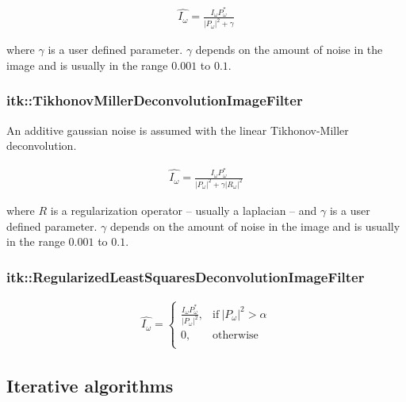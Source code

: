 \documentclass{InsightArticle}
\begin{document}
\begin{eqnarray}
\label{eq:imageFormation}
\hat{I_{\omega}} = \frac{I_{\omega} P_{\omega}^*}{\lvert P_{\omega}\rvert^2 + \gamma}
\end{eqnarray}

where $\gamma$ is a user defined parameter. $\gamma$ depends on the amount of noise in the image and is
usually in the range $0.001$ to $0.1$.

\subsubsection{itk::TikhonovMillerDeconvolutionImageFilter}

An additive gaussian noise is assumed with the linear Tikhonov-Miller deconvolution. 

\begin{eqnarray}
\label{eq:imageFormation}
\hat{I_{\omega}} = \frac{I_{\omega} P_{\omega}^*}{\lvert P_{\omega}\rvert^2 + \gamma\lvert R_{\omega}\rvert^2}
\end{eqnarray}

where $R$ is a regularization operator -- usually a laplacian -- and $\gamma$ is a user defined parameter.
$\gamma$ depends on the amount of noise in the image and is usually in the range $0.001$ to $0.1$.

\subsubsection{itk::RegularizedLeastSquaresDeconvolutionImageFilter}

\begin{eqnarray}
\label{eq:imageFormation}
\hat{I_{\omega}} =
\begin{cases} 
  \frac{I_{\omega} P_{\omega}^*}{\lvert P_{\omega}\rvert^2},  & \text{if}~ \lvert P_{\omega}\rvert^2 > \alpha \\
  0,  & \text{otherwise} \\
\end{cases}
\end{eqnarray}


\subsection{Iterative algorithms}
\end{document}
